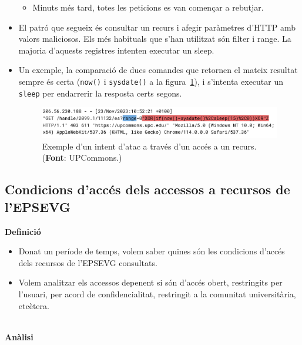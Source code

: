 \begin{itemize}
\begin{itemize}
        \item Minuts més tard, totes les peticions es van començar a rebutjar.
    \end{itemize}
    \item El patró que segueix és consultar un recurs i afegir paràmetres d'\gls{HTTP} amb valors maliciosos.
    Els més habituals que s'han utilitzat són filter i range.
    La majoria d'aquests registres intenten executar un sleep.
    \item Un exemple, la comparació de dues comandes que retornen el mateix resultat sempre és certa (\texttt{now()} i \texttt{sysdate()} a la figura~\ref{fig:log-attack-example}), i s'intenta executar un \texttt{sleep} per endarrerir la resposta certs segons. \\
    \begin{figure}[htbp]
        \centerline{\includegraphics[width=\textwidth]{figures/log-attack}}
        \captionsetup{justification=centering}
        \caption[Exemple d'un intent d'atac a través d'un accés a un recurs.]{Exemple d'un intent d'atac a través d'un accés a un recurs. (\textbf{Font}: UPCommons.)}\label{fig:log-attack-example}
    \end{figure}
\end{itemize}

\clearpage

\subsection{Condicions d'accés dels accessos a recursos de l'EPSEVG}\label{subsec:acces-conditions}

\textbf{Definició}

\begin{itemize}
    \item Donat un període de temps, volem saber quines són les condicions d'accés dels recursos de l'EPSEVG consultats.
    \item Volem analitzar els accessos depenent si són d'accés obert, restringits per l'usuari, per acord de confidencialitat, restringit a la comunitat universitària, etcètera.
\end{itemize}

\noindent \\
\textbf{Anàlisi}

